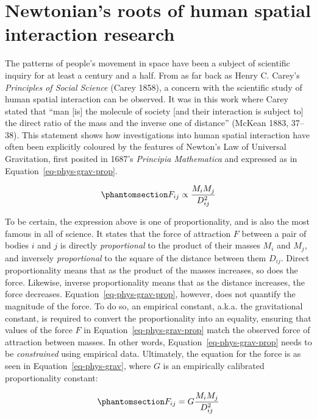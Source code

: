 \documentclass[
]{article}
\begin{document}
\section{Newtonian's roots of human spatial interaction
research}\label{newtonians-roots-of-human-spatial-interaction-research}

The patterns of people's movement in space have been a subject of
scientific inquiry for at least a century and a half. From as far back
as Henry C. Carey's \emph{Principles of Social Science} (Carey 1858), a
concern with the scientific study of human spatial interaction can be
observed. It was in this work where Carey stated that ``man {[}is{]} the
molecule of society {[}and their interaction is subject to{]} the direct
ratio of the mass and the inverse one of distance'' (McKean 1883,
37--38). This statement shows how investigations into human spatial
interaction have often been explicitly coloured by the features of
Newton's Law of Universal Gravitation, first posited in 1687's
\emph{Principia Mathematica} and expressed as in
Equation~\ref{eq-phys-grav-prop}.

\begin{equation}\phantomsection\label{eq-phys-grav-prop}{
F_{ij} \propto \frac{M_i M_j} {D_{ij}^{2}}
}\end{equation}

To be certain, the expression above is one of proportionality, and is
also the most famous in all of science. It states that the force of
attraction \(F\) between a pair of bodies \(i\) and \(j\) is directly
\emph{proportional} to the product of their masses \(M_i\) and \(M_j\),
and inversely \emph{proportional} to the square of the distance between
them \(D_{ij}\). Direct proportionality means that as the product of the
masses increases, so does the force. Likewise, inverse proportionality
means that as the distance increases, the force decreases.
Equation~\ref{eq-phys-grav-prop}, however, does not quantify the
magnitude of the force. To do so, an empirical constant, a.k.a. the
gravitational constant, is required to convert the proportionality into
an equality, ensuring that values of the force \(F\) in
Equation~\ref{eq-phys-grav-prop} match the observed force of attraction
between masses. In other words, Equation~\ref{eq-phys-grav-prop} needs
to be \emph{constrained} using empirical data. Ultimately, the equation
for the force is as seen in Equation~\ref{eq-phys-grav}, where \(G\) is
an empirically calibrated proportionality constant:

\begin{equation}\phantomsection\label{eq-phys-grav}{
F_{ij} = G \frac{M_i M_j} {D_{ij}^{2}}
}\end{equation}
\end{document}
